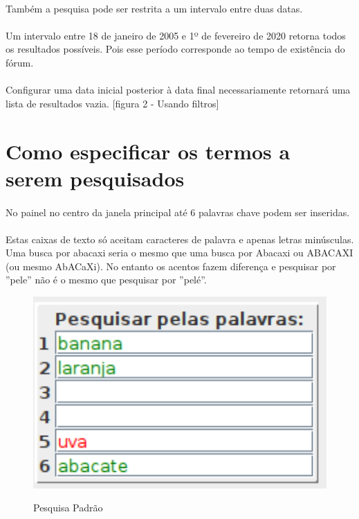 \documentclass[a4paper,12pt,openany]{book}
\begin{document}
\paragraph{}
Também a pesquisa pode ser restrita a um intervalo entre duas datas.
\paragraph{}
Um intervalo entre 18 de janeiro de 2005 e 1º de fevereiro de 2020 retorna todos os resultados possíveis. Pois esse período corresponde ao tempo de existência do fórum.
\paragraph{}
Configurar uma data inicial posterior à data final necessariamente retornará uma lista de resultados vazia.
[figura 2 - Usando filtros]

\section*{Como especificar os termos a serem pesquisados}

\paragraph{}
No painel no centro da janela principal até 6 palavras chave podem ser inseridas.
\paragraph{}
Estas caixas de texto só aceitam caracteres de palavra e apenas letras minúsculas. Uma busca por abacaxi seria o mesmo que uma busca por Abacaxi ou ABACAXI (ou mesmo AbACaXi). No entanto os acentos fazem diferença e pesquisar por ”pele” não é o mesmo que pesquisar por ”pelé”.

\begin{figure}[h]
	\caption{Pesquisa Padrão}
	
	\centering %
	\includegraphics[width=15cm]{Figuras/pesquisa-padrao.png} %
	\label{figura:qualquernome}
\end{figure}
\end{document}
